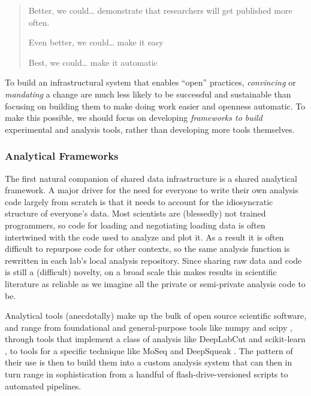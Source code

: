 \documentclass[10pt]{article}
\begin{document}
\begin{multicols}{2}
\begin{quote}
Better, we could\ldots{} demonstrate that researchers will get published
more often.

Even better, we could\ldots{} make it easy

Best, we could\ldots{} make it automatic \cite{spiesWorkflowCentricApproachIncreasing2017} 
\end{quote}

To build an infrastructural system that enables ``open'' practices,
\emph{convincing} or \emph{mandating} a change are much less likely to
be successful and sustainable than focusing on building them to make
doing work easier and openness automatic. To make this possible, we
should focus on developing \emph{frameworks to build} experimental and
analysis tools, rather than developing more tools themselves.

\hypertarget{analytical-frameworks}{%
\subsubsection{Analytical Frameworks}\label{analytical-frameworks}}

The first natural companion of shared data infrastructure is a shared
analytical framework. A major driver for the need for everyone to write
their own analysis code largely from scratch is that it needs to account
for the idiosyncratic structure of everyone's data. Most scientists are
(blessedly) not trained programmers, so code for loading and negotiating
loading data is often intertwined with the code used to analyze and plot
it. As a result it is often difficult to repurpose code for other
contexts, so the same analysis function is rewritten in each lab's local
analysis repository. Since sharing raw data and code is still a
(difficult) novelty, on a broad scale this makes results in scientific
literature as reliable as we imagine all the private or semi-private
analysis code to be.

Analytical tools (anecdotally) make up the bulk of open source
scientific software, and range from foundational and general-purpose
tools like numpy \cite{harrisArrayProgrammingNumPy2020}  and
scipy \cite{virtanenSciPyFundamentalAlgorithms2020} , through
tools that implement a class of analysis like DeepLabCut \cite{mathisDeepLabCutMarkerlessPose2018a}  and scikit-learn \cite{pedregosaScikitlearnMachineLearning2011} , to tools for a specific
technique like MoSeq \cite{wiltschkoRevealingStructurePharmacobehavioral2020}  and DeepSqueak
\cite{coffeyDeepSqueakDeepLearningbased2019} . The pattern of
their use is then to build them into a custom analysis system that can
then in turn range in sophistication from a handful of
flash-drive-versioned scripts to automated pipelines.


\end{multicols}
\end{document}
